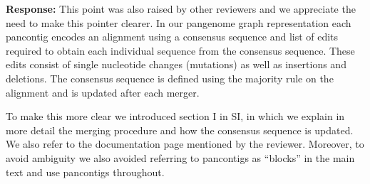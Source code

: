 \documentclass[aps,rmp,onecolumn]{revtex4-1}
\newcommand{\response}[1]{{\it {\color{response}\textbf{Response:} #1}}\vskip 5mm}
\begin{document}
\response{This point was also raised by other reviewers and we appreciate the need to make this pointer clearer.
      In our pangenome graph representation each pancontig encodes an alignment using a consensus sequence and list of edits required to obtain each individual sequence from the consensus sequence.
      These edits consist of single nucleotide changes (mutations) as well as insertions and deletions.
      The consensus sequence is defined using the majority rule on the alignment and is updated after each merger.

      To make this more clear we introduced section I in SI, in which we explain in more detail the merging procedure and how the consensus sequence is updated. We also refer to the documentation page mentioned by the reviewer. Moreover, to avoid ambiguity we also avoided referring to pancontigs as ``blocks'' in the main text and use pancontigs throughout.}
\end{document}
